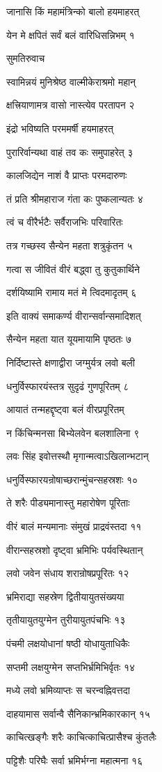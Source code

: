 जानासि किं महामंत्रिन्को बालो हयमाहरत्

येन मे क्षपितं सर्वं बलं वारिधिसन्निभम् १

सुमतिरुवाच

स्वामिन्नयं मुनिश्रेष्ठ वाल्मीकेराश्रमो महान्

क्षत्त्रियाणामत्र वासो नास्त्येव परतापन २

इंद्रो भविष्यति परममर्षी हयमाहरत्

पुरारिर्वान्यथा वाहं तव कः समुपाहरेत् ३

कालजिद्येन नाशं वै प्राप्तः परमदारुणः

तं प्रति श्रीमहाराज गंता कः पुष्कलान्यतः ४

त्वं च वीरैर्भटैः सर्वैराजभिः परिवारितः

तत्र गच्छस्व सैन्येन महता शत्रुकृंतन ५

गत्वा स जीवितं वीरं बद्ध्वा तु कुतुकार्थिने

दर्शयिष्यामि रामाय मतं मे त्विदमादृतम् ६

इति वाक्यं समाकर्ण्य वीरान्सर्वान्समादिशत्

सैन्येन महता यात यूयमायामि पृष्ठतः ७

निर्दिष्टास्ते क्षणाद्वीरा जग्मुर्यत्र लवो बली

धनुर्विस्फारयंस्तत्र सुदृढं गुणपूरितम् ८

आयातं तन्महद्दृष्ट्वा बलं वीरप्रपूरितम्

न किंचिन्मनसा बिभ्येलवेन बलशालिना ९

लवः सिंह इवोत्तस्थौ मृगान्मत्वाऽखिलान्भटान्

धनुर्विस्फारयन्रोषाच्छरान्मुंचन्सहस्रशः १०

ते शरैः पीड्यमानास्तु महारोषेण पूरिताः

वीरं बालं मन्यमानाः संमुखं प्राद्रवंस्तदा ११

वीरान्सहस्रशो दृष्ट्वा भ्रमिभिः पर्यवस्थितान्

लवो जवेन संधाय शरान्रोषप्रपूरितः १२

भ्रमिराद्या सहस्रेण द्वितीयायुतसंख्यया

तृतीयायुतयुग्मेन तुरीयायुतपंचभिः १३

पंचमी लक्षयोधानां षष्ठी योधायुताधिकैः

सप्तमी लक्षयुग्मेन सप्तभिर्भ्रमिभिर्वृतः १४

मध्ये लवो भ्रमिव्याप्तः स चरन्वह्निवत्तदा

दाहयामास सर्वान्वै सैनिकान्भ्रमिकारकान् १५

काचित्खङ्गैः शरैः काचित्काचित्प्रासैश्च कुंतलैः

पट्टिशैः परिघैः सर्वा भ्रमिर्भग्ना महात्मना १६

